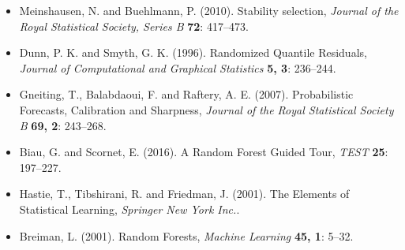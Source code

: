 \documentclass[american,foldmarks=false,noconfig]{uibklttr}
\begin{document}
\begin{itemize}[leftmargin=*]
\item[] Meinshausen, N. and Buehlmann, P. (2010). 
Stability selection,
\textit{Journal of the Royal Statistical Society, Series B} 
\textbf{72}: 417--473.

\item[] Dunn, P. K. and Smyth, G. K. (1996).
Randomized Quantile Residuals,
\textit{Journal of Computational and Graphical Statistics}
\textbf{5, 3}: 236--244.

\item[] Gneiting, T., Balabdaoui, F. and Raftery, A. E. (2007).
Probabilistic Forecasts, Calibration and Sharpness,
\textit{Journal of the Royal Statistical Society B}
\textbf{69, 2}: 243--268.

\item[] Biau, G. and Scornet, E. (2016).
A Random Forest Guided Tour,
\textit{TEST}
\textbf{25}: 197--227.

\item[] Hastie, T., Tibshirani, R. and Friedman, J. (2001).
The Elements of Statistical Learning,
\textit{Springer New York Inc.}.

\item[] Breiman, L. (2001).
Random Forests,
\textit{Machine Learning}
\textbf{45, 1}: 5--32.

\end{itemize}
\end{document}
